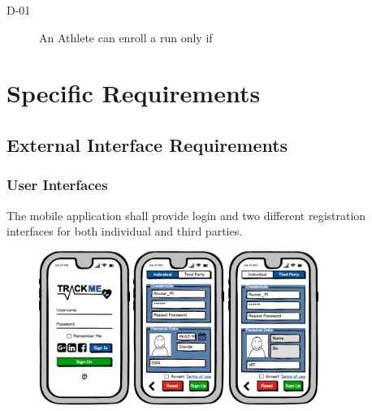 \documentclass[a4paper]{article}
\begin{document}
        \begin{description}
            \item[D-01] An Athlete can enroll a run only if 
        \end{description}
        
\newpage
\section{Specific Requirements}

    \subsection{External Interface Requirements}
        
        \subsubsection{User Interfaces}
        
        The mobile application shall provide login and two different registration interfaces for both individual and third parties.
        
        \begin{figure}[!htpb]
    	\centering
    	\includegraphics[height=50mm]{images/mockups/Login_Registration.png}
    	\includegraphics[height=50mm]{images/mockups/RegistrationForm.png}
    	\includegraphics[height=50mm]{images/mockups/ThirdPartyRegistration.png}
        \end{figure}
        
\end{document}
